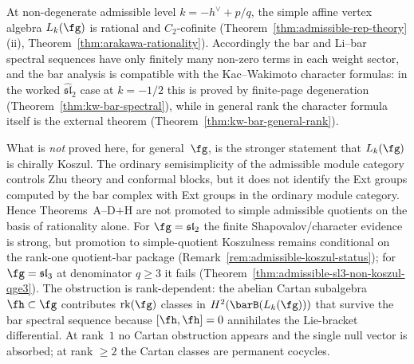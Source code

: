 \begin{remark}
\label{rem:admissible-rationality-finiteness}
At non-degenerate admissible level $k = -h^\vee + p/q$, the
simple affine vertex algebra $L_k(\fg)$ is rational and
$C_2$-cofinite
\textup{(}Theorem~\ref{thm:admissible-rep-theory}(ii),
Theorem~\ref{thm:arakawa-rationality}\textup{)}.
Accordingly the bar and Li--bar spectral sequences have only
finitely many non-zero terms in each weight sector, and the
bar analysis is compatible with the Kac--Wakimoto character
formulas: in the worked $\widehat{\mathfrak{sl}}_2$ case at
$k=-1/2$ this is proved by finite-page degeneration
\textup{(}Theorem~\ref{thm:kw-bar-spectral}\textup{)}, while in
general rank the character formula itself is the external theorem
\textup{(}Theorem~\ref{thm:kw-bar-general-rank}\textup{)}.

What is \emph{not} proved here, for general~$\fg$, is the stronger
statement that $L_k(\fg)$ is chirally Koszul. The ordinary
semisimplicity of the admissible module category controls Zhu theory
and conformal blocks, but it does not identify the Ext groups
computed by the bar complex with Ext groups in the ordinary module
category. Hence Theorems~A--D$+$H are not promoted to simple
admissible quotients on the basis of rationality alone.
For $\fg = \mathfrak{sl}_2$ the finite Shapovalov/character evidence
is strong, but promotion to simple-quotient Koszulness remains
conditional on the rank-one quotient-bar package
\textup{(}Remark~\textup{\ref{rem:admissible-koszul-status}}\textup{)};
for $\fg = \mathfrak{sl}_3$ at denominator $q \geq 3$ it fails
\textup{(}Theorem~\textup{\ref{thm:admissible-sl3-non-koszul-qge3}}\textup{)}.
The obstruction is rank-dependent: the abelian Cartan subalgebra
$\fh \subset \fg$ contributes $\mathrm{rk}(\fg)$ classes in
$H^2(\barB(L_k(\fg)))$ that survive the bar spectral sequence
because $[\fh, \fh] = 0$ annihilates the Lie-bracket differential.
At rank~$1$ no Cartan obstruction appears and the single null
vector is absorbed; at rank $\geq 2$ the Cartan classes are
permanent cocycles.
\end{remark}

